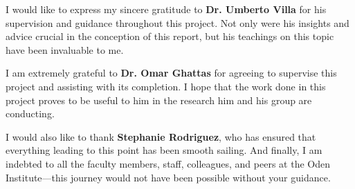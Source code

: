 
I would like to express my sincere gratitude to \textbf{Dr. Umberto Villa} for his supervision and guidance throughout this project. Not only were his insights and advice crucial in the conception of this report, but his teachings on this topic have been invaluable to me.

I am extremely grateful to \textbf{Dr. Omar Ghattas} for agreeing to supervise this project and assisting with its completion. I hope that the work done in this project proves to be useful to him in the research him and his group are conducting.

I would also like to thank \textbf{Stephanie Rodriguez}, who has ensured that everything leading to this point has been smooth sailing. And finally, I am indebted to all the faculty members, staff, colleagues, and peers at the Oden Institute---this journey would not have been possible without your guidance.
